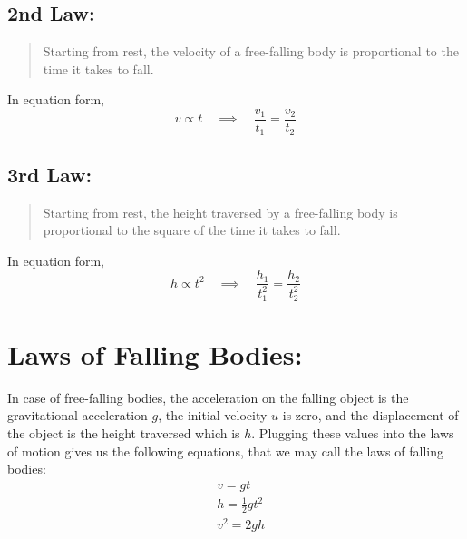 \documentclass[a4paper]{report}
\begin{document}
        \subsection{2nd Law: }
            \begin{quotation}
                \item Starting from rest, the velocity of a free-falling body is proportional to the time it takes to fall.
            \end{quotation}
            In equation form, \\
            \begin{equation}
                v \propto t \quad \implies \quad \frac{v_1}{t_1} = \frac{v_2}{t_2}
            \end{equation}
        \subsection{3rd Law: }
            \begin{quotation}
                \item Starting from rest, the height traversed by a free-falling body is proportional to the square of the time it takes to fall.
            \end{quotation}
            In equation form, \\
            \begin{equation}
                h \propto t^2 \quad \implies \quad \frac{h_1}{t_1^2} = \frac{h_2}{t_2^2}
            \end{equation}
    \section{Laws of Falling Bodies: }
        In case of free-falling bodies, the acceleration on the falling object is the gravitational acceleration $g$, the initial velocity $u$ is zero, and the displacement of the object is the height traversed which is $h$. Plugging these values into the laws of motion gives us the following equations, that we may call the laws of falling bodies:
        \\
        \begin{eqnarray}
            &v = gt \\
            &h = \frac{1}{2}gt^2 \\
            &v^2 = 2gh
        \end{eqnarray}
\end{document}
